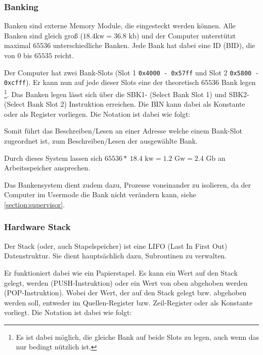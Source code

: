 \documentclass{scrartcl}
\begin{document}
\subsubsection{\label{section:banking}Banking}


Banken sind externe Memory Module, die eingesteckt werden können. Alle Banken sind gleich groß ($18.4\text{kw} = 36.8\text{ kb}$) und der Computer unterstützt maximal $65536$ unterschiedliche Banken. Jede Bank hat dabei eine ID (BID), die von $0$ bis $65535$ reicht.

Der Computer hat zwei Bank-Slots (Slot 1 \texttt{0x4000 - 0x57ff} und Slot 2 \texttt{0x5800 - 0xcfff}). Er kann nun auf jede dieser Slots eine der theoretisch $65536$ Bank legen
\footnote{Es ist dabei möglich, die gleiche Bank auf beide Slots zu legen, auch wenn das nur bedingt nützlich ist.}. Das Banken legen lässt sich über die SBK1- (Select Bank Slot 1) und SBK2- (Select Bank Slot 2) Instruktion erreichen. Die BIN kann dabei als Konstante oder als Register vorliegen. Die Notation ist dabei wie folgt:


Somit führt das Beschreiben/Lesen an einer Adresse welche einem Bank-Slot zugeordnet ist, zum Beschreiben/Lesen der ausgewählte Bank.

Durch dieses System lassen sich $65536 * ~18.4\text{ kw} = 1.2\text{ Gw} = 2.4\text{ Gb}$ an Arbeitsspeicher ansprechen.

Das Bankensystem dient zudem dazu, Prozesse voneinander zu isolieren, da der Computer im Usermode  die Bank nicht verändern kann, siehe \autoref{section:supervisor}.

\subsubsection{\label{section:stack}Hardware Stack}

Der Stack (oder, auch Stapelspeicher) ist eine LIFO (Last In First Out) Datenstruktur. Sie dient hauptsächlich dazu, Subroutinen zu verwalten. 

Er funktioniert dabei wie ein Papierstapel. Es kann ein Wert auf den Stack gelegt, werden (PUSH-Instruktion) oder ein Wert von oben abgehoben werden (POP-Instruktion). Wobei der Wert, der auf den Stack gelegt bzw. abgehoben werden soll, entweder im Quellen-Register bzw. Zeil-Register oder als Konstante vorliegt. Die Notation ist dabei wie folgt:

\end{document}
